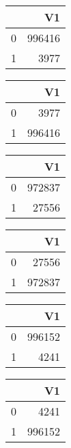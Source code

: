 \bigskip\bigskip
\centering
\begin{tabular}{rr}
  \hline
 & V1 \\ 
  \hline
0 & 996416 \\ 
  1 & 3977 \\ 
   \hline
\end{tabular}

\bigskip\bigskip
\centering
\begin{tabular}{rr}
  \hline
 & V1 \\ 
  \hline
0 & 3977 \\ 
  1 & 996416 \\ 
   \hline
\end{tabular}

\bigskip\bigskip
\centering
\begin{tabular}{rr}
  \hline
 & V1 \\ 
  \hline
0 & 972837 \\ 
  1 & 27556 \\ 
   \hline
\end{tabular}

\bigskip\bigskip
\centering
\begin{tabular}{rr}
  \hline
 & V1 \\ 
  \hline
0 & 27556 \\ 
  1 & 972837 \\ 
   \hline
\end{tabular}

\bigskip\bigskip
\centering
\begin{tabular}{rr}
  \hline
 & V1 \\ 
  \hline
0 & 996152 \\ 
  1 & 4241 \\ 
   \hline
\end{tabular}

\bigskip\bigskip
\centering
\begin{tabular}{rr}
  \hline
 & V1 \\ 
  \hline
0 & 4241 \\ 
  1 & 996152 \\ 
   \hline
\end{tabular}

